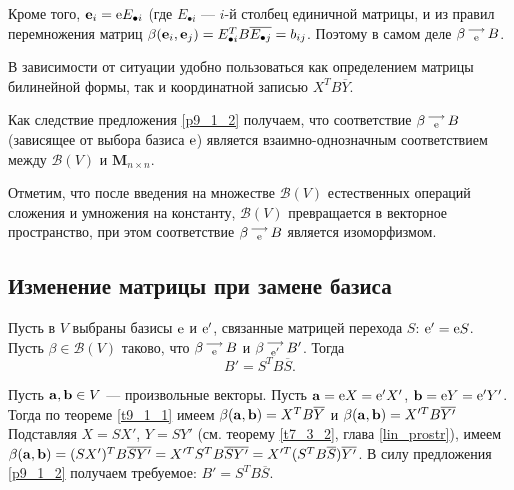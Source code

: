 Кроме того, $\mathbf{e}_i = \mathrm{e} E_{\bullet i}$ (где $E_{\bullet i}$ --- $i$-й столбец единичной матрицы, и из правил перемножения матриц
$\beta (\mathbf{e}_i, \mathbf{e}_j) = E_{\bullet i} ^T B \overline{E_{\bullet j}} =b_{ij}$.
Поэтому в самом деле $\beta \begin{smallmatrix} \longrightarrow \\ \mathrm{e} \end{smallmatrix} B$.
\edok

\otstup

В зависимости от ситуации удобно пользоваться как определением матрицы билинейной формы, так и координатной записью $X^T B \overline{Y}$.



Как следствие предложения \ref{p9_1_2} получаем, что соответствие $\beta \begin{smallmatrix} \longrightarrow \\ \mathrm{e} \end{smallmatrix} B$ (зависящее от выбора базиса $\mathrm{e}$)
является взаимно-однозначным соответствием между $\mathcal{B} (V)$ и $\mathbf{M}_{n\times n}$.

{\footnotesize Отметим, что после введения на множестве $\mathcal{B} (V)$ естественных операций сложения и умножения на константу, 
$\mathcal{B} (V)$ превращается в векторное пространство, при этом соответствие $\beta \begin{smallmatrix} \longrightarrow \\ \mathrm{e} \end{smallmatrix} B$ является изоморфизмом. %
}

\subsection{Изменение матрицы при замене базиса}

\begin{theor}\label{t9_1_2}
Пусть в $V$ выбраны базисы $\mathrm{e}$ и $\mathrm{e}'$, связанные матрицей перехода $S$:
$\mathrm{e}'= \mathrm{e} S$.
Пусть $\beta \in \mathcal{B} (V)$ таково, что 
$\beta \begin{smallmatrix} \longrightarrow \\ \mathrm{e} \end{smallmatrix} B$ и $\beta \begin{smallmatrix} \longrightarrow \\ \mathrm{e}' \end{smallmatrix} B'$.
Тогда  $$\boxed{B'=S^TB\overline{S}}.$$
\end{theor}
\dok Пусть $\mathbf{a}, \mathbf{b} \in V$ --- произвольные векторы. Пусть $\mathbf{a}=\mathrm{e}X = \mathrm{e}'X'$, 
$\mathbf{b}=\mathrm{e}Y = \mathrm{e}'Y'$.
Тогда по теореме \ref{t9_1_1}  имеем $\beta (\mathbf{a}, \mathbf{b}) = X^T B \overline{Y}$ и $\beta (\mathbf{a}, \mathbf{b}) = X'^T B \overline{Y'}$
Подставляя  $X=SX'$, $Y=SY'$ (см. теорему \ref{t7_3_2}, глава \ref{lin_prostr}),
 имеем $\beta (\mathbf{a}, \mathbf{b}) = (SX')^T B \overline{SY'} = X'^T S^T B \overline{S} \overline{Y'} = X'^T (S^T B \overline{S}) \overline{Y'} $. 
В силу предложения \ref{p9_1_2} получаем требуемое: $B'=S^TB\overline{S}$.
\edok


